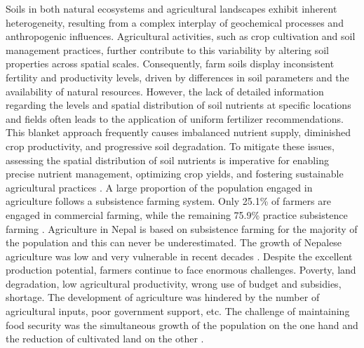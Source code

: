 Soils in both natural ecosystems and agricultural landscapes exhibit inherent heterogeneity, resulting from a complex interplay of geochemical processes and anthropogenic influences. Agricultural activities, such as crop cultivation and soil management practices, further contribute to this variability by altering soil properties across spatial scales. Consequently, farm soils display inconsistent fertility and productivity levels, driven by differences in soil parameters and the availability of natural resources. However, the lack of detailed information regarding the levels and spatial distribution of soil nutrients at specific locations and fields often leads to the application of uniform fertilizer recommendations. This blanket approach frequently causes imbalanced nutrient supply, diminished crop productivity, and progressive soil degradation. To mitigate these issues, assessing the spatial distribution of soil nutrients is imperative for enabling precise nutrient management, optimizing crop yields, and fostering sustainable agricultural practices \parencite{dahalNewApproachMeasure2024a}.
A large proportion of the population engaged in agriculture follows a subsistence farming system. Only 25.1\% of farmers are engaged in commercial farming, while the remaining 75.9\% practice subsistence farming \parencite{simkhadaReviewNepalsIncreasing2019}. Agriculture in Nepal is based on subsistence farming for the majority of the population and this can never be underestimated. The growth of Nepalese agriculture was low and very vulnerable in recent decades  \parencite{gyawaliOverviewAgricultureNepal2021}. Despite the excellent production potential, farmers continue to face enormous challenges. Poverty, land degradation, low agricultural productivity, wrong use of budget and subsidies, shortage. The development of agriculture was hindered by the number of agricultural inputs, poor government support, etc. The challenge of maintaining food security was the simultaneous growth of the population on the one hand and the reduction of cultivated land on the other \parencite{gyawaliOverviewAgricultureNepal2021}.




